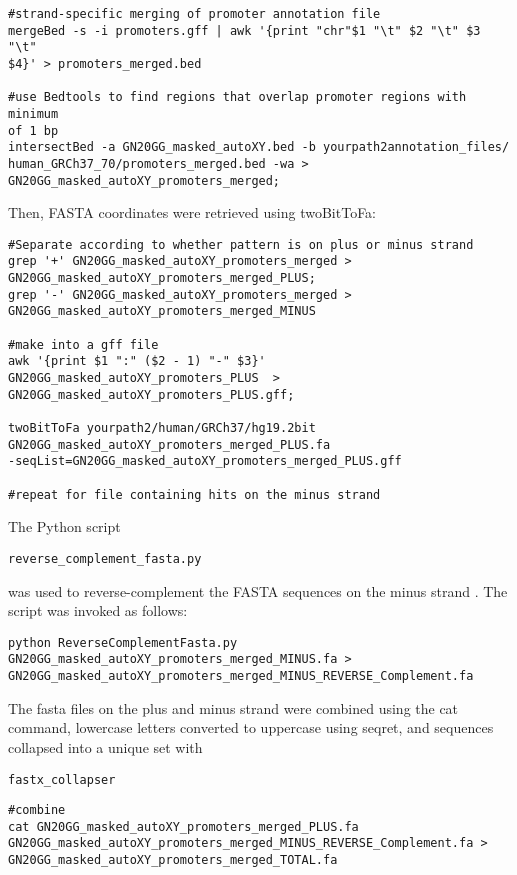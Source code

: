 \begin{footnotesize}
\begin{lstlisting}
#strand-specific merging of promoter annotation file
mergeBed -s -i promoters.gff | awk '{print "chr"$1 "\t" $2 "\t" $3 "\t"
$4}' > promoters_merged.bed 

#use Bedtools to find regions that overlap promoter regions with minimum 
of 1 bp 
intersectBed -a GN20GG_masked_autoXY.bed -b yourpath2annotation_files/
human_GRCh37_70/promoters_merged.bed -wa >
GN20GG_masked_autoXY_promoters_merged;
\end{lstlisting}

Then, FASTA coordinates were retrieved using twoBitToFa:

\begin{lstlisting}
#Separate according to whether pattern is on plus or minus strand
grep '+' GN20GG_masked_autoXY_promoters_merged >
GN20GG_masked_autoXY_promoters_merged_PLUS; 
grep '-' GN20GG_masked_autoXY_promoters_merged >
GN20GG_masked_autoXY_promoters_merged_MINUS 

#make into a gff file
awk '{print $1 ":" ($2 - 1) "-" $3}' GN20GG_masked_autoXY_promoters_PLUS  >
GN20GG_masked_autoXY_promoters_PLUS.gff;

twoBitToFa yourpath2/human/GRCh37/hg19.2bit
GN20GG_masked_autoXY_promoters_merged_PLUS.fa 
-seqList=GN20GG_masked_autoXY_promoters_merged_PLUS.gff 

#repeat for file containing hits on the minus strand
\end{lstlisting}

The Python script \begin{lstlisting}
reverse_complement_fasta.py
\end{lstlisting} 
was used to reverse-complement the FASTA sequences on the minus strand \cite{Kao:Online}. The script was invoked as follows:

\begin{lstlisting}
python ReverseComplementFasta.py GN20GG_masked_autoXY_promoters_merged_MINUS.fa >
GN20GG_masked_autoXY_promoters_merged_MINUS_REVERSE_Complement.fa
\end{lstlisting}

The fasta files on the plus and minus strand were combined using the cat command, lowercase letters converted to uppercase using seqret, and sequences collapsed into a unique set with \begin{lstlisting}
fastx_collapser 
\end{lstlisting}

\begin{lstlisting}
#combine
cat GN20GG_masked_autoXY_promoters_merged_PLUS.fa 
GN20GG_masked_autoXY_promoters_merged_MINUS_REVERSE_Complement.fa >
GN20GG_masked_autoXY_promoters_merged_TOTAL.fa


\end{lstlisting}
\end{footnotesize}
